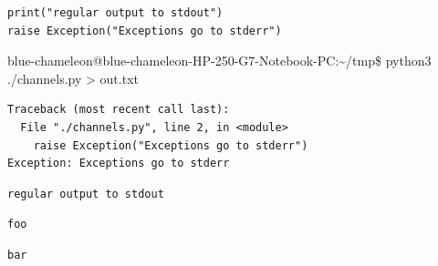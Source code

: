 \begin{frame}[fragile]
%
\begin{codebox}
\begin{verbatim}
print("regular output to stdout")
raise Exception("Exceptions go to stderr")
\end{verbatim}
\end{codebox}
%
\begin{cmdbox}
\scriptsize
{\color{green}blue-chameleon@blue-chameleon-HP-250-G7-Notebook-PC}:{\color{blue}\textasciitilde/tmp}\$
python3 ./channels.py > out.txt
\end{cmdbox}
%
\begin{cmdbox}
\begin{verbatim}
Traceback (most recent call last):
  File "./channels.py", line 2, in <module>
    raise Exception("Exceptions go to stderr")
Exception: Exceptions go to stderr
\end{verbatim}
\end{cmdbox}
%
\begin{cmdbox}
\begin{verbatim}
regular output to stdout
\end{verbatim}
\end{cmdbox}
%
\end{frame}




\begin{frame}[fragile]
%
\begin{tcbraster}[raster columns=2,
                  raster equal height,
                  nobeforeafter,
                  raster column skip=0.5cm]
\begin{codebox}
\begin{verbatim}
foo
\end{verbatim}
\end{codebox}
%
\begin{codebox}
\begin{verbatim}
bar
\end{verbatim}
\end{codebox}
\end{tcbraster}
%
\end{frame}

